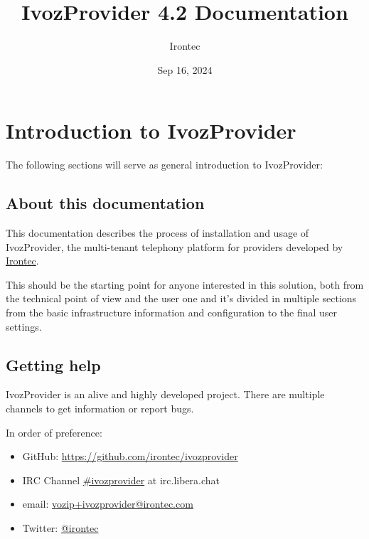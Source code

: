 \documentclass[letterpaper,10pt,english]{sphinxmanual}
\title{IvozProvider 4.2 Documentation}
\date{Sep 16, 2024}
\author{Irontec}
\begin{document}
\maketitle
\tableofcontents
{}\label{index::doc}



\chapter{Introduction to IvozProvider}
\label{basic_concepts/intro/index::doc}\label{basic_concepts/intro/index:introduction-to-ivozprovider}\label{basic_concepts/intro/index:ivozprovider-official-documentation}
The following sections will serve as general introduction to IvozProvider:


\section{About this documentation}
\label{basic_concepts/intro/about::doc}\label{basic_concepts/intro/about:about-this-documentation}
This documentation describes the process of installation and usage of
IvozProvider, the multi-tenant telephony platform for providers developed
by \href{http://irontec.com}{Irontec}.

This should be the starting point for anyone interested in this solution,
both from the technical point of view and the user one and it's divided
in multiple sections from the basic infrastructure information and configuration
to the final user settings.


\section{Getting help}
\label{basic_concepts/intro/getting_help:getting-help}\label{basic_concepts/intro/getting_help::doc}\label{basic_concepts/intro/getting_help:id1}
IvozProvider is an alive and highly developed project. There are
multiple channels to get information or report bugs.

In order of preference:
\begin{itemize}
\item {} 
GitHub: \url{https://github.com/irontec/ivozprovider}

\item {} 
IRC Channel \href{https://kiwiirc.com/nextclient/irc.libera.chat/\#ivozprovider}{\#ivozprovider} at irc.libera.chat

\item {} 
email: \href{mailto:vozip+ivozprovider@irontec.com}{vozip+ivozprovider@irontec.com}

\item {} 
Twitter: \href{https://twitter.com/irontec}{@irontec}

\end{itemize}
\end{document}
